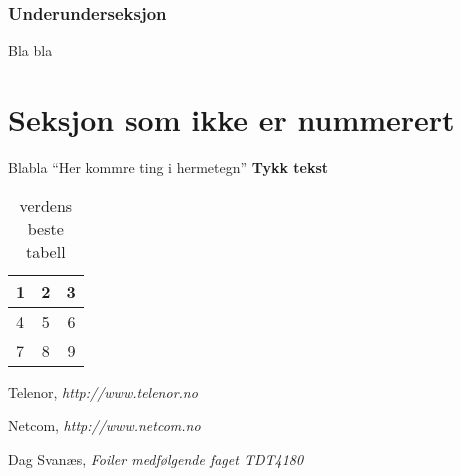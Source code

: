 \documentclass[titlepage]{article}
\begin{document}
\subsubsection{Underunderseksjon}
Bla bla

\newpage

\section*{Seksjon som ikke er nummerert}
Blabla
``Her kommre ting i hermetegn'' %
\textbf{Tykk tekst}




\begin{table}[H]
   \centering
   \label{tab:lulz}
   \begin{tabular}{| l | c | r |}
      \hline
      1 & 2 & 3 \\
      \hline
      4 & 5 & 6 \\
      \hline
      7 & 8 & 9 \\
      \hline
   \end{tabular}
   \caption{verdens beste tabell}
\end{table}


%

\newpage
\begin{thebibliography}{9}

	Telenor,
	\emph{http://www.telenor.no}

	Netcom,
	\emph{http://www.netcom.no}

	Dag Svanæs,
	\emph{Foiler medfølgende faget TDT4180}
\end{thebibliography}
\end{document}
